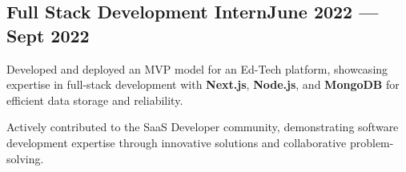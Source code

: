 \subsection{{Full Stack Development Intern\hfill June 2022 --- Sept 2022}}
\begin{zitemize}
\item Developed and deployed an MVP model for an Ed-Tech platform, showcasing expertise in full-stack development with \textbf{Next.js}, \textbf{Node.js}, and \textbf{MongoDB} for efficient data storage and reliability.
\item Actively contributed to the SaaS Developer community, demonstrating software development expertise through innovative solutions and collaborative problem-solving.
\end{zitemize}

